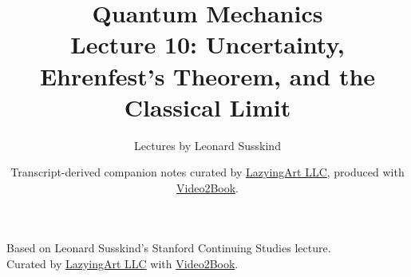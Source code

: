\documentclass[11pt,oneside]{book}
\begin{document}
\frontmatter
\title{Quantum Mechanics\\Lecture 10: Uncertainty, Ehrenfest's Theorem, and the Classical Limit}
\author{Lectures by Leonard Susskind}
\date{Transcript-derived companion notes curated by \href{https://lazying.art}{LazyingArt LLC}, produced with \href{https://github.com/lachlanchen/Video2Book}{Video2Book}.}
\maketitle
\setcounter{page}{2}
\begin{center}
\small Based on Leonard Susskind's Stanford Continuing Studies lecture.\\
Curated by \href{https://lazying.art}{LazyingArt LLC} with \href{https://github.com/lachlanchen/Video2Book}{Video2Book}.
\end{center}
\clearpage
\mainmatter

\end{document}
